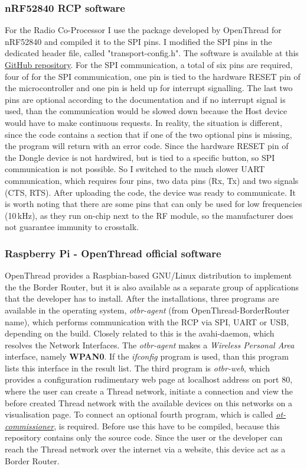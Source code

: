 \subsubsection{nRF52840 RCP software}
For the Radio Co-Processor I use the package developed by OpenThread for nRF52840 and compiled it to the SPI pins. I modified the SPI pins in the dedicated header file, called "transport-config.h". The software is available at this \href{https://github.com/openthread/ot-nrf528xx}{GitHub repository}\cite{OTBR}. For the SPI communication, a total of six pins are required, four of for the SPI communication, one pin is tied to the hardware RESET pin of the microcontroller and one pin is held up for interrupt signalling. The last two pins are optional according to the documentation and if no interrupt signal is used, than the communication would be slowed down because the Host device would have to make continuous requests. In reality, the situation is different, since the code contains a section that if one of the two optional pins is missing, the program will return with an error code. Since the hardware RESET pin of the Dongle device is not hardwired, but is tied to a specific button, so SPI communication is not possible. So I switched to the much slower UART communication, which requires four pins, two data pins (Rx, Tx) and two signals (CTS, RTS). After uploading the code, the device was ready to communicate. It is worth noting that there are some pins that can only be used for low frequencies (10\,\si{\kilo\hertz}), as they run on-chip next to the RF module, so the manufacturer does not guarantee immunity to crosstalk.

\subsubsection{Raspberry Pi - OpenThread official software}
OpenThread provides a Raspbian-based GNU/Linux distribution to implement the the Border Router, but it is also available as a separate group of applications that the developer has to install. After the installations, three programs are available in the operating system, \textit{otbr-agent} (from OpenThread-BorderRouter name), which performs communication with the RCP via SPI, UART or USB, depending on the build. Closely related to this is the avahi-daemon, which resolves the Network Interfaces. The \textit{otbr-agent} makes a \textit{Wireless Personal Area} interface, namely \textbf{WPAN0}. If the \textit{ifconfig} program is used, than this program lists this interface in the result list. The third program is \textit{otbr-web}, which provides a configuration rudimentary web page at localhost address on port 80, where the user can create a Thread network, initiate a connection and view the before created Thread network with the available devices on this networks on a visualisation page. To connect an optional fourth program, which is called \href{https://github.com/openthread/ot-commissioner}{\textit{ot-commissioner}}\cite{OTCOMMISSIONER}, is required. Before use this have to be compiled, because this repository contains only the source code. Since the user or the developer can reach the Thread network over the internet via a website, this device act as a Border Router.

